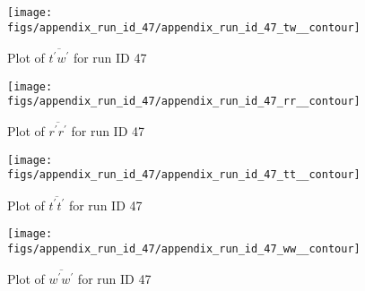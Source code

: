 \begin{figure}[H]
\centering
\texttt{[image: figs/appendix\_run\_id\_47/appendix\_run\_id\_47\_tw\_\_contour]}
\caption{Plot of $\overline{t^\prime w^\prime}$ for run ID 47}
\label{fig:appendix_run_id_47_tw__contour}
\end{figure}


\begin{figure}[H]
\centering
\texttt{[image: figs/appendix\_run\_id\_47/appendix\_run\_id\_47\_rr\_\_contour]}
\caption{Plot of $\overline{r^\prime r^\prime}$ for run ID 47}
\label{fig:appendix_run_id_47_rr__contour}
\end{figure}


\begin{figure}[H]
\centering
\texttt{[image: figs/appendix\_run\_id\_47/appendix\_run\_id\_47\_tt\_\_contour]}
\caption{Plot of $\overline{t^\prime t^\prime}$ for run ID 47}
\label{fig:appendix_run_id_47_tt__contour}
\end{figure}


\begin{figure}[H]
\centering
\texttt{[image: figs/appendix\_run\_id\_47/appendix\_run\_id\_47\_ww\_\_contour]}
\caption{Plot of $\overline{w^\prime w^\prime}$ for run ID 47}
\label{fig:appendix_run_id_47_ww__contour}
\end{figure}


